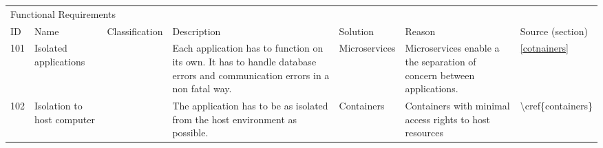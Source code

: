 \clearpage
\setlength\LTleft{-2.5cm}
\begin{longtable}{l p{1.5cm} l p{4cm} p{2cm} p{4cm} l }
\multicolumn{7}{l}{Functional Requirements}                                                                                                                                                                                                                                                                                                                                                                                                                                                                                                                  \\
ID  & Name                                    & Classification & Description                                                                                                                                                                                & Solution                 & Reason                                                                                                                                                                                                                         & Source (section)                   \\ \hline
101 & Isolated applications                   &                & Each application has to function on its own. It has to handle database errors and communication errors in a non fatal way.                                                                 & Microservices            & Microservices enable a the separation of concern between applications.                                                                                                                                                         & \cref{cotnainers} \\
102 & Isolation to host computer              &                & The application has to be as isolated from the host environment as possible.                                                                                                               & Containers               & Containers with minimal access rights to host resources                                                                                                                                                                        & \textbackslash{}cref\{containers\} \\

\end{longtable}
